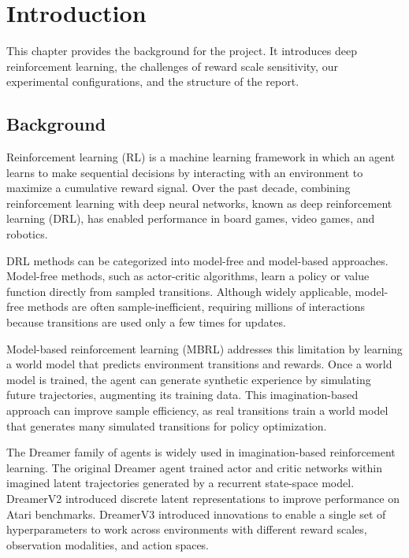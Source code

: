 \chapter{Introduction}
\label{ch:into}

This chapter provides the background for the project. It introduces deep reinforcement learning, the challenges of reward scale sensitivity, our experimental configurations, and the structure of the report.

\section{Background}
\label{sec:into_back}

Reinforcement learning (RL) is a machine learning framework in which an agent learns to make sequential decisions by interacting with an environment to maximize a cumulative reward signal. Over the past decade, combining reinforcement learning with deep neural networks, known as deep reinforcement learning (DRL), has enabled performance in board games, video games, and robotics.

DRL methods can be categorized into model-free and model-based approaches. Model-free methods, such as actor-critic algorithms, learn a policy or value function directly from sampled transitions. Although widely applicable, model-free methods are often sample-inefficient, requiring millions of interactions because transitions are used only a few times for updates.

Model-based reinforcement learning (MBRL) addresses this limitation by learning a world model that predicts environment transitions and rewards. Once a world model is trained, the agent can generate synthetic experience by simulating future trajectories, augmenting its training data. This imagination-based approach can improve sample efficiency, as real transitions train a world model that generates many simulated transitions for policy optimization.

The Dreamer family of agents is widely used in imagination-based reinforcement learning. The original Dreamer agent trained actor and critic networks within imagined latent trajectories generated by a recurrent state-space model. DreamerV2 introduced discrete latent representations to improve performance on Atari benchmarks. DreamerV3 introduced innovations to enable a single set of hyperparameters to work across environments with different reward scales, observation modalities, and action spaces.

